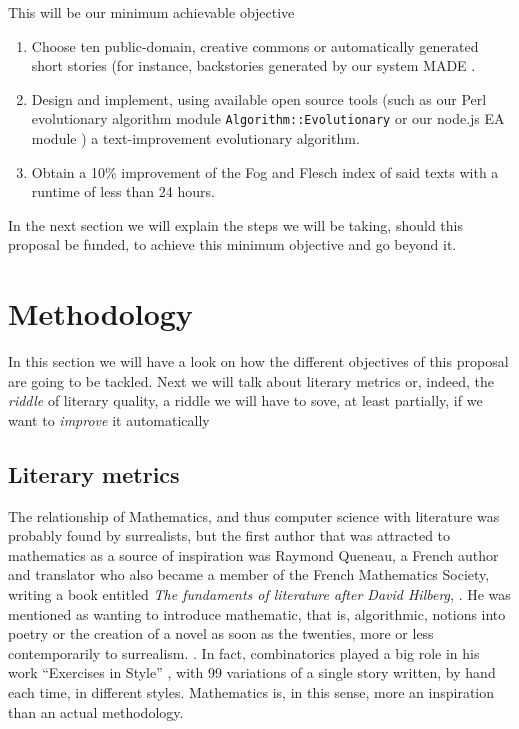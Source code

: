 \documentclass[a4paper,12pt,twocolumn]{article}
\begin{document}
This will be our minimum achievable objective\begin{enumerate}
\item Choose ten public-domain, creative commons or automatically
  generated short stories (for instance, backstories generated by our
  system MADE \cite{2014arXiv1403.3084G}.
\item Design and implement, using available open source tools (such as our Perl
  evolutionary algorithm module {\tt Algorithm::Evolutionary}
  \cite{ae09} or our node.js EA module \cite{nodeo2014}) a
  text-improvement evolutionary algorithm. 
\item Obtain a 10\% improvement of the Fog and Flesch index of said
  texts with a runtime of less than 24 hours. 
\end{enumerate}

In the next section we will explain the steps we will be taking,
should this proposal be funded, to
achieve this minimum objective and go beyond it. 

\section{Methodology}
\label{sec:meth}

In this section we will have a look on how the different objectives of
this proposal are going to be tackled. Next we will talk about
literary metrics or, indeed, the {\em riddle} of literary quality, a
riddle we will have to sove, at least partially, if we want to {\em
  improve} it automatically

\subsection{Literary metrics}

The relationship of Mathematics, and thus computer science with
literature was probably found by surrealists, but the first author
that was attracted to mathematics as a source of inspiration was
Raymond Queneau, a French author and translator who also became a
member of the French Mathematics Society, writing a book entitled {\em
  The fundaments of literature after David Hilberg},
\cite{queneau1976fondements}. He was mentioned as wanting to introduce
mathematic, that is, algorithmic, notions into poetry or the creation
of a novel as soon as the twenties, more or less contemporarily to
surrealism. \cite{emmer2005mathematics}. In fact, combinatorics played
a big role in his work ``Exercises in Style''
\cite{queneau2013exercises}, with 99 variations of a single story
written, by hand each time, in different styles. Mathematics is, in
this sense, more an inspiration than an actual methodology. 
\end{document}
